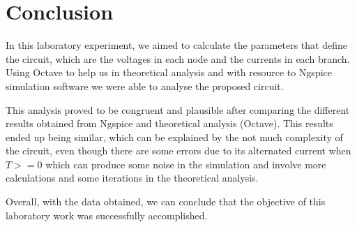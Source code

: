 \section{Conclusion}
\label{sec:conclusion}

In this laboratory experiment, we aimed to calculate the parameters that define the circuit, which are the voltages in each node and the currents in each branch.
Using Octave to help us in theoretical analysis and with resource to Ngspice simulation software we were able to analyse the proposed circuit.

This analysis proved to be congruent and plausible after comparing the different results obtained from Ngspice and theoretical analysis (Octave). This results ended up being similar, which can be explained by the not much complexity of the circuit, even though there are some errors due to its alternated current when $T>=0$ which can produce some noise in the simulation and involve more calculations and some iterations in the theoretical analysis.

Overall, with the data obtained, we can conclude that the objective of this laboratory work was successfully accomplished.

